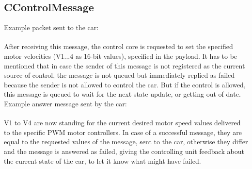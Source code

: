 \subsection*{CControlMessage}
Example packet sent to the car:\\
 \\
\newline
\newline
After receiving this message, the control core is requested to set the specified motor velocities (V1...4 as 16-bit values), specified in the payload. It has to be mentioned that in case the sender of this message is not registered as the current source of control, the message is not queued but immediately replied as failed because the sender is not allowed to control the car.
But if the control is allowed, this message is queued to wait for the next state update, or getting out of date.\\
\newline
Example answer message sent by the car:\\
\\
\newline
V1 to V4 are now standing for the current desired motor speed values delivered to the specific PWM motor controllers. In case of a successful message, they are equal to the requested values of the message, sent to the car, otherwise they differ and the message is answered as \glqq failed\grqq , giving the controlling unit feedback about the current state of the car, to let it know what might have failed.

